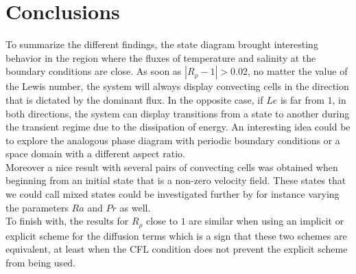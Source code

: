 \documentclass{article}
\begin{document}
\section{Conclusions}
To summarize the different findings, the state diagram brought interesting behavior in the region where the fluxes of temperature and salinity at the boundary conditions are close. As soon as $|R_{\rho}-1| > 0.02$, no matter the value of the Lewis number, the system will always display convecting cells in the direction that is dictated by the dominant flux. In the opposite case, if $Le$ is far from $1$, in both directions, the system can display transitions from a state to another during the transient regime due to the dissipation of energy. An interesting idea could be to explore the analogous phase diagram with periodic boundary conditions or a space domain with a different aspect ratio.
\\
Moreover a nice result with several pairs of convecting cells was obtained when beginning from an initial state that is a non-zero velocity field. These states that we could call mixed states could be investigated further by for instance varying the parameters $Ra$ and $Pr$ as well.
\\
To finish with, the results for $R_{\rho}$ close to $1$ are similar when using an implicit or explicit scheme for the diffusion terms which is a sign that these two schemes are equivalent, at least when the CFL condition does not prevent the explicit scheme from being used.
\end{document}
